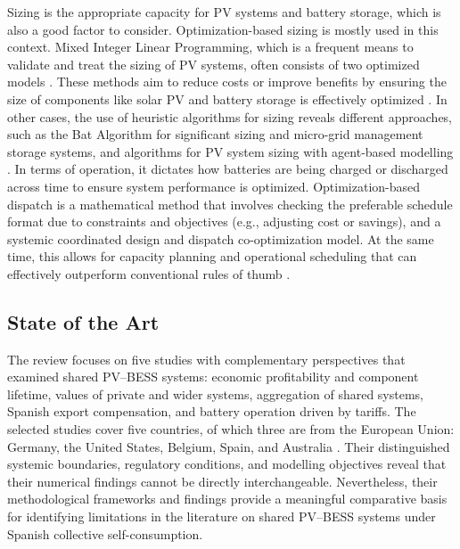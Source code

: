 Sizing is the appropriate capacity for PV systems and battery storage, which is also a good factor to consider. Optimization-based sizing is mostly used in this context. Mixed Integer
Linear Programming, which is a frequent means to validate and treat the
sizing of PV systems, often consists of two optimized models
\cite{ch2ref046}. These methods aim to reduce costs or improve benefits by ensuring the
size of components like solar PV and battery storage is effectively
optimized \cite{ch2ref047}. In other cases, the use of heuristic algorithms
for sizing reveals different approaches, such as the Bat Algorithm for
significant sizing and micro-grid management storage systems, and
algorithms for PV system sizing with agent-based modelling
\cite{ch2ref046}. In terms of operation, it dictates how batteries are being charged or
discharged across time to ensure system performance is optimized.
Optimization-based dispatch is a mathematical method that involves
checking the preferable schedule format due to constraints and
objectives (e.g., adjusting cost or savings), and a systemic coordinated
design and dispatch co-optimization model. At the same time, this allows
for capacity planning and operational scheduling that can effectively
outperform conventional rules of thumb \cite{ch2ref047}.



\subsection{State of the Art}
\label{subsec:state-of-the-art}


The review focuses on five studies with complementary perspectives that examined shared PV--BESS systems: economic profitability and component lifetime, values of private and wider systems, aggregation of shared systems, Spanish export compensation, and battery operation driven by tariffs. The selected studies cover five countries, of which three are from the European Union: Germany, the United States, Belgium, Spain, and Australia
\cite{ch2ref002,ch2ref031,ch2ref051,ch2ref062,ch2ref066}. Their distinguished systemic boundaries, regulatory conditions, and modelling objectives reveal that their numerical findings cannot be directly interchangeable.
Nevertheless, their methodological frameworks and findings provide a meaningful comparative basis for identifying limitations in the literature on shared PV--BESS systems under Spanish collective self-consumption.

